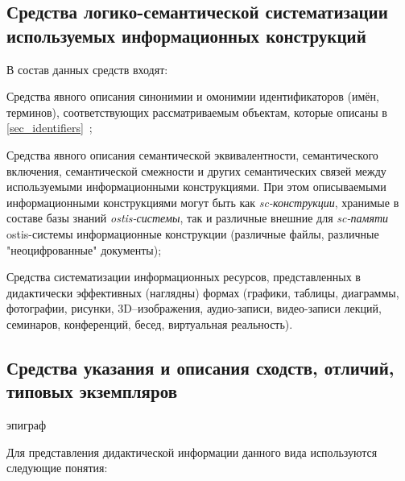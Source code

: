 \newpage
\subsection{Средства логико-семантической систематизации используемых информационных конструкций}
\label{subsec_means_logical-semantic_systematization_used_information_structures}

В состав данных средств входят:
\begin{textitemize}
	\item Средства явного описания синонимии и омонимии идентификаторов (имён, терминов), соответствующих рассматриваемым объектам, которые описаны в \ref{sec_identifiers}~;
	\item Средства явного описания семантической эквивалентности, семантического включения, семантической смежности и других семантических связей между используемыми информационными конструкциями. При этом описываемыми информационными конструкциями могут быть как \textit{sc-конструкции}, хранимые в составе базы знаний \textit{ostis-системы}, так и различные внешние для \textit{sc-памяти} ostis-системы информационные конструкции (различные файлы, различные "неоцифрованные"{} документы);
	\item Средства систематизации информационных ресурсов, представленных в дидактически эффективных (наглядны) формах (графики, таблицы, диаграммы, фотографии, рисунки, 3D--изображения, аудио-записи, видео-записи лекций, семинаров, конференций, бесед, виртуальная реальность).
\end{textitemize}

\newpage
\subsection{Средства указания и описания сходств, отличий, типовых экземпляров}
\label{subsec_means_indicating_similarities_differences_specimens}

\begin{SCn}
	\begin{scnrelfromlist}{эпиграф}
	\end{scnrelfromlist}
\end{SCn}

Для представления дидактической информации данного вида используются следующие понятия:

\begin{SCn}
\end{SCn}


